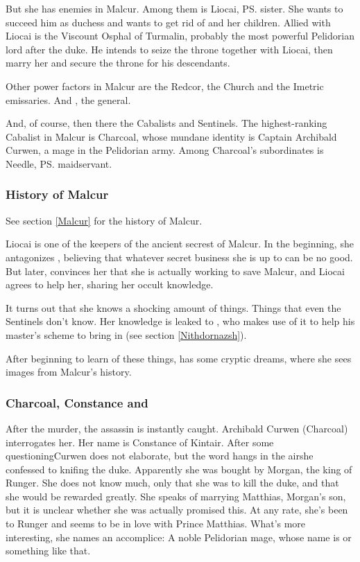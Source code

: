 \begin{garbage}
But she has enemies in Malcur. 
Among them is Liocai, \ps{\Icor} sister. 
She wants to succeed him as duchess and wants to get rid of \Tiroco{} and her children. Allied with Liocai is the Viscount Osphal of Turmalin, probably the most powerful Pelidorian lord after the duke. He intends to seize the throne together with Liocai, then marry her and secure the throne for his descendants. 

Other power factors in Malcur are the Redcor, the \Telcra{} Church and the Imetric emissaries. And , the general. 

And, of course, then there the Cabalists and Sentinels. The highest-ranking Cabalist in Malcur is Charcoal, whose mundane identity is Captain Archibald Curwen, a mage in the Pelidorian army. Among Charcoal's subordinates is Needle, \ps{\Tiroco} maidservant. 






\subsubsection{History of Malcur}
See section \ref{Malcur} for the history of Malcur. 

Liocai is one of the keepers of the ancient secrest of Malcur. In the beginning, she antagonizes \Tiroco, believing that whatever secret business she is up to can be no good. But later, \Tiroco{} convinces her that she is actually working to save Malcur, and Liocai agrees to help her, sharing her occult knowledge. 

It turns out that she knows a shocking amount of things. 
Things that even the Sentinels don't know. 
Her knowledge is leaked to \Psyrex, who makes use of it to help his master's scheme to bring in \Nithdornazsh{} (see section \ref{Nithdornazsh}). 

After beginning to learn of these things, \Tiroco{} has some cryptic dreams, where she sees images from Malcur's history.





\subsubsection{Charcoal, Constance and \Onatol}
After the murder, the assassin is instantly caught. %
Archibald Curwen (Charcoal) interrogates her. Her name is Constance of Kintair. After some questioning\dash Curwen does not elaborate, but the word  hangs in the air\dash she confessed to knifing the duke. Apparently she was bought by Morgan, the king of Runger. She does not know much, only that she was to kill the duke, and that she would be rewarded greatly. She speaks of marrying Matthias, Morgan's son, but it is unclear whether she was actually promised this. At any rate, she's been to Runger and seems to be in love with Prince Matthias. What's more interesting, she names an accomplice: A noble Pelidorian mage, whose name is \Ambrose{} \Anatoli{} or something like that. 


\end{garbage}
